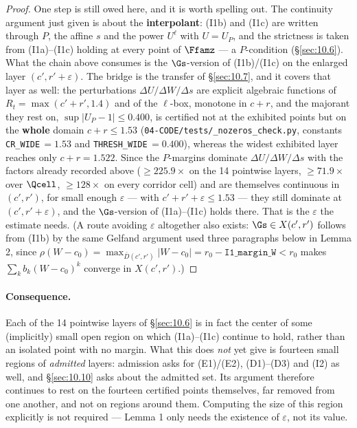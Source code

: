 \begin{proof}
One step is still owed here, and it is worth spelling out. The continuity argument just given is about the \textbf{interpolant}: (I1b) and (I1c) are written through $P$, the affine $s$ and the power $U^{\ell}$ with $U=U_P$, and the strictness is taken from (I1a)--(I1c) holding at every point of $\Ffamz$ --- a $P$-condition (\S\ref{sec:10.6}). What the chain above consumes is the $\Gs$-version of (I1b)/(I1c) on the enlarged layer $(c',r'+\varepsilon)$. The bridge is the transfer of \S\ref{sec:10.7}, and it covers that layer as well: the perturbations $\Delta U/\Delta W/\Delta s$ are explicit algebraic functions of $R_t=\max(c'+r',1.4)$ and of the $\ell$-box, monotone in $c+r$, and the majorant they rest on, $\sup|U_P-1|\le0.400$, is certified not at the exhibited points but on the \textbf{whole} domain $c+r\le1.53$ (\texttt{04-\allowbreak CODE/\allowbreak tests/\allowbreak \_\allowbreak nozeros\_\allowbreak check.py}, constants \texttt{CR\_\allowbreak WIDE}$\,=1.53$ and \texttt{THRESH\_\allowbreak WIDE}$\,=0.400$), whereas the widest exhibited layer reaches only $c+r=1.522$. Since the $P$-margins dominate $\Delta U/\Delta W/\Delta s$ with the factors already recorded above ($\ge225.9\times$ on the 14 pointwise layers, $\ge71.9\times$ over $\Qcell$, $\ge128\times$ on every corridor cell) and are themselves continuous in $(c',r')$, for small enough $\varepsilon$ --- with $c'+r'+\varepsilon\le1.53$ --- they still dominate at $(c',r'+\varepsilon)$, and the $\Gs$-version of (I1a)--(I1c) holds there. That is the $\varepsilon$ the estimate needs. (A route avoiding $\varepsilon$ altogether also exists: $\Gs\in X(c',r')$ follows from (I1b) by the same Gelfand argument used three paragraphs below in Lemma 2, since $\rho(W-c_0)=\max_{\bar D(c',r')}|W-c_0|=r_0-\texttt{I1\_margin\_W}<r_0$ makes $\sum_k b_k (W-c_0)^k$ converge in $X(c',r')$.) \qedhere
\end{proof}

\paragraph{Consequence.} Each of the 14 pointwise layers of \S\ref{sec:10.6} is in fact the center
of some (implicitly) small open region on which (I1a)--(I1c) continue to hold, rather than an
isolated point with no margin. What this does \emph{not} yet give is fourteen
small regions of \emph{admitted} layers: admission asks for (E1)/(E2), (D1)--(D3)
and (I2) as well, and \S\ref{sec:10.10} asks about the admitted set. Its argument
therefore continues to rest on the fourteen certified points themselves, far
removed from one another, and not on regions around them.
Computing the size of this region explicitly is not required ---
Lemma 1 only needs the existence of $\varepsilon$, not its value.


